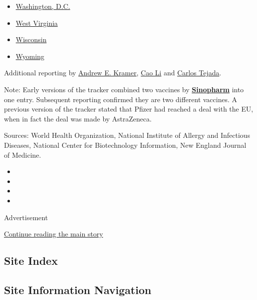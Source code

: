 \begin{itemize}
\item
  \href{https://www.nytimes3xbfgragh.onion/interactive/2020/us/washington-dc-coronavirus-cases.html}{Washington,
  D.C.}
\item
  \href{https://www.nytimes3xbfgragh.onion/interactive/2020/us/west-virginia-coronavirus-cases.html}{West
  Virginia}
\item
  \href{https://www.nytimes3xbfgragh.onion/interactive/2020/us/wisconsin-coronavirus-cases.html}{Wisconsin}
\item
  \href{https://www.nytimes3xbfgragh.onion/interactive/2020/us/wyoming-coronavirus-cases.html}{Wyoming}
\end{itemize}

Additional reporting by
\href{https://www.nytimes3xbfgragh.onion/by/andrew-e-kramer}{Andrew E.
Kramer}, \href{https://www.nytimes3xbfgragh.onion/by/cao-li}{Cao Li} and
\href{https://www.nytimes3xbfgragh.onion/by/carlos-tejada}{Carlos
Tejada}.

Note: Early versions of the tracker combined two vaccines by
\textbf{\protect\hyperlink{sinopharm}{Sinopharm}} into one entry.
Subsequent reporting confirmed they are two different vaccines. A
previous version of the tracker stated that Pfizer had reached a deal
with the EU, when in fact the deal was made by AstraZeneca.

Sources: World Health Organization, National Institute of Allergy and
Infectious Diseases, National Center for Biotechnology Information, New
England Journal of Medicine.

\begin{itemize}
\item
\item
\item
\item
\end{itemize}

Advertisement

\protect\hyperlink{after-bottom}{Continue reading the main story}

\hypertarget{site-index}{%
\subsection{Site Index}\label{site-index}}

\hypertarget{site-information-navigation}{%
\subsection{Site Information
Navigation}\label{site-information-navigation}}

